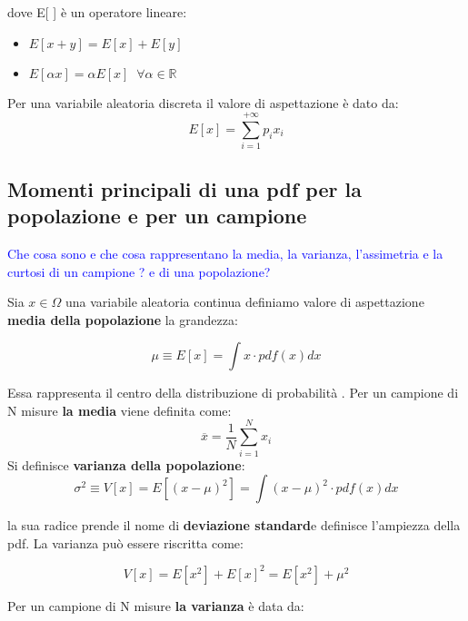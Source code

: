 \documentclass[11pt,a4paper]{book}
\begin{document}
dove  E[ ] \`{e} un operatore lineare:

\begin{itemize}
	\item $E[x+y] = E[x] + E[y]$
	\item $E[\alpha x] = \alpha E[x] \;\; \forall \alpha \in \mathbb{R}$
\end{itemize}
 Per una variabile aleatoria discreta il valore di aspettazione \`{e} dato da:
 \begin{equation}
 	E[x] = \sum_{i=1}^{+\infty} p_i x_i
 \end{equation}

\subsection{Momenti principali di una pdf per la popolazione e per un campione}

\textcolor{blue}{Che cosa sono e che cosa rappresentano la media, la varianza, l'assimetria e la curtosi di un campione ? e di una popolazione?} \newline

Sia $x \in \Omega $ una variabile aleatoria continua definiamo valore di aspettazione \textbf{media della popolazione} la grandezza:

\begin{equation}
	\mu \equiv E[x] = \int{x \cdot pdf(x)dx}
\end{equation}


\noindent Essa rappresenta il centro della distribuzione di probabilit\`{a} .\newline 
Per un campione di N  misure \textbf{la media} viene definita come: 
\begin{equation}
	\overline{x} = \dfrac{1}{N}\sum_{i=1}^Nx_{i}
\end{equation}
Si definisce \textbf{varianza della popolazione}:
\begin{equation}
	\sigma^2 \equiv V[x] = E[(x-\mu)^2] = \int{(x-\mu)^2 \cdot pdf(x)dx} 	
\end{equation}

la sua radice prende il nome di \textbf{deviazione standard}e definisce l'ampiezza della pdf. La varianza pu\`{o} essere riscritta come:

\begin{equation}
	V[x] = E[x^2] + E[x]^2 = E[x^2] + \mu^2
\end{equation}

Per un campione di N misure \textbf{la varianza} \`{e} data da:
\end{document}
